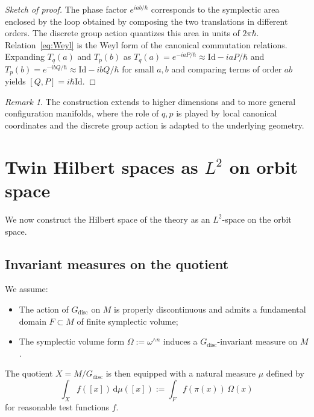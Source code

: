 \documentclass[11pt]{article}
\numberwithin{equation}{section}
\theoremstyle{definition}
\theoremstyle{remark}
\newtheorem{remark}[theorem]{Remark}
\newcommand{\dd}{\mathrm{d}}
\newcommand{\Id}{\mathrm{Id}}
\newcommand{\Gdisc}{G_{\mathrm{disc}}}
\begin{document}
	\begin{proof}[Sketch of proof]
		The phase factor $e^{iab/\hbar}$ corresponds to the symplectic area
		enclosed by the loop obtained by composing the two translations in
		different orders. The discrete group action quantizes this area in units
		of $2\pi\hbar$. Relation~\eqref{eq:Weyl} is the Weyl form of the
		canonical commutation relations. Expanding $T_q(a)$ and $T_p(b)$ as
		$T_q(a)=e^{-iaP/\hbar}\approx \Id - i a P/\hbar$ and
		$T_p(b)=e^{-ibQ/\hbar}\approx \Id - i b Q/\hbar$ for small $a,b$ and comparing terms
		of order $ab$ yields $[Q,P]=i\hbar\Id$.
	\end{proof}
	
	\begin{remark}
		The construction extends to higher dimensions and to more general
		configuration manifolds, where the role of $q,p$ is played by local
		canonical coordinates and the discrete group action is adapted to the
		underlying geometry.
	\end{remark}
	
	
	\section{Twin Hilbert spaces as $L^2$ on orbit space}
	\label{sec:Hilbert}
	
	We now construct the Hilbert space of the theory as an $L^2$-space on
	the orbit space.
	
	\subsection{Invariant measures on the quotient}
	
	We assume:
	
	\begin{itemize}[leftmargin=2em]
		\item The action of $\Gdisc$ on $M$ is properly discontinuous and admits
		a fundamental domain $F\subset M$ of finite symplectic volume;
		\item The symplectic volume form $\Omega:=\omega^{\wedge n}$ induces a
		$\Gdisc$-invariant measure on $M$.
	\end{itemize}
	
	The quotient $X=M/\Gdisc$ is then equipped with a natural measure $\mu$
	defined by
	\[
	\int_X f([x])\, \dd\mu([x])
	:= \int_F f(\pi(x))\, \Omega(x)
	\]
	for reasonable test functions $f$.
	
\end{document}
